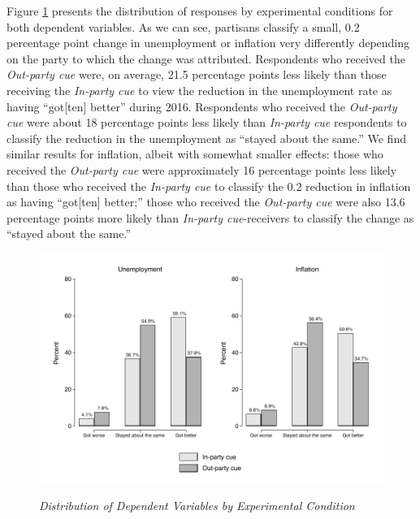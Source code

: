 \documentclass[12pt, letterpaper]{article}
\begin{document}
Figure \ref{fig:combined_exp} presents the distribution of responses by experimental conditions for both dependent variables. As we can see, partisans classify a small, 0.2 percentage point change in unemployment or inflation very differently depending on the party to which the change was attributed. Respondents who received the \textit{Out-party cue} were, on average, 21.5 percentage points less likely than those receiving the \textit{In-party cue} to view the reduction in the unemployment rate as having ``got[ten] better'' during 2016. Respondents who received the \textit{Out-party cue} were about 18 percentage points less likely than \textit{In-party cue} respondents to classify the reduction in the unemployment as ``stayed about the same.'' We find similar results for inflation, albeit with somewhat smaller effects: those who received the \textit{Out-party cue} were approximately 16 percentage points less likely than those who received the \textit{In-party cue} to classify the 0.2 reduction in inflation as having ``got[ten] better;'' those who received the \textit{Out-party cue} were also 13.6 percentage points more likely than \textit{In-party cue}-receivers to classify the change as ``stayed about the same.''


\begin{center}
\begin{figure}[H]
  \centering
  \caption{\textit{Distribution of Dependent Variables by Experimental Condition}}
  \includegraphics[width=\textwidth]{../figs/combined_nontroll.pdf}
  \label{fig:combined_exp}
\end{figure}
\end{center}

\vspace{-2.5cm}
\end{document}
